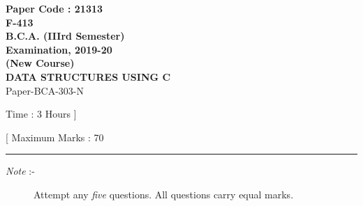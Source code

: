 \documentclass[12pt]{article}
\begin{document}
\pagestyle{empty}

\begin{center}

	\textsf{
		\textbf{
			\LARGE Paper Code : 21313\\
			\normalsize F-413\\
			B.C.A. (IIIrd Semester)\\
			Examination, 2019-20\\
			(New Course)\\
			\small{DATA STRUCTURES USING C\\}
		}
		Paper-BCA-303-N
	}

	\begin{minipage}{0.49\linewidth}
		\raggedright\footnotesize Time : 3 Hours ]
	\end{minipage}
	\begin{minipage}{0.49\linewidth}
		\raggedleft\footnotesize [ Maximum Marks : 70
	\end{minipage}

\end{center}

\rule{0.9\linewidth}{0.1mm}

\begin{description}
	\item[\textit{Note }:-] Attempt any \textit{five} questions. All questions carry equal marks.
\end{description}
\end{document}
